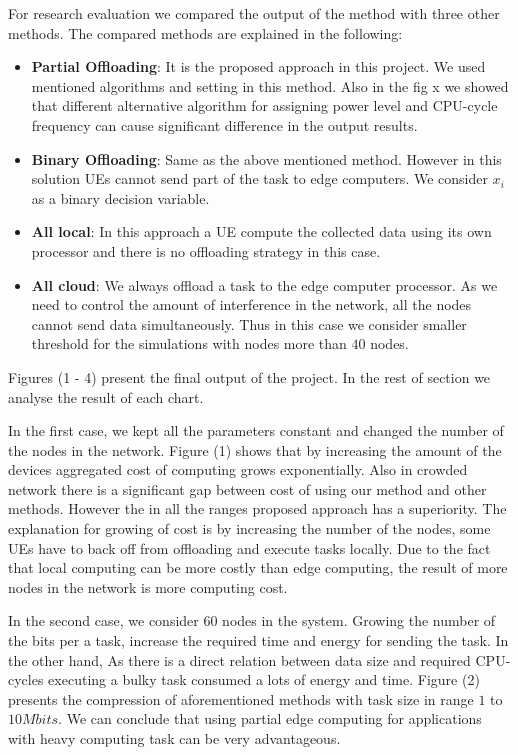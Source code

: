 \documentclass[12pt,final,3p]{CSP}
\begin{document}
For research evaluation we compared the output of the method with three other methods. The compared methods are explained in the following:
\begin{itemize}
    \item \textbf{Partial Offloading}: It is the proposed approach in this project. We used mentioned algorithms and setting in this method. Also in the fig x we showed that different alternative algorithm for assigning power level and CPU-cycle frequency can cause significant difference in the output results. 
    \item \textbf{Binary Offloading}: Same as the above mentioned method. However in this solution UEs cannot send part of the task to edge computers. We consider $x_i$ as a binary decision variable. 
    \item \textbf{All local}: In this approach a UE compute the collected data using its own processor and there is no offloading strategy in this case. 
    \item \textbf{All cloud}: We always offload a task to the edge computer processor. As we need to control the amount of interference in the network, all the nodes cannot send data simultaneously. Thus in this case we consider smaller threshold for the simulations with nodes more than $40$ nodes.
\end{itemize}
Figures (1 - 4) present the final output of the project. In the rest of section we analyse the result of each chart.

In the first case, we kept all the parameters constant and changed the number of the nodes in the network. Figure (1) shows that by increasing the amount of the devices aggregated cost of computing grows exponentially. Also in crowded network there is a significant gap between cost of using our method and other methods. However the in all the ranges proposed approach has a superiority. The explanation for growing of cost is by increasing the number of the nodes, some UEs have to back off from offloading and execute tasks locally. Due to the fact that local computing can be more costly than edge computing, the result of more nodes in the network is more computing cost.

In the second case, we consider $60$ nodes in the system. Growing the number of the bits per a task, increase the required time and energy for sending the task. In the other hand, As there is a direct relation between data size and required CPU-cycles executing a bulky task consumed a lots of energy and time. Figure (2) presents the compression of aforementioned methods with task size in range $1$ to $10 Mbits$. We can conclude that using partial edge computing for applications with heavy computing task can be very advantageous. 
\end{document}
